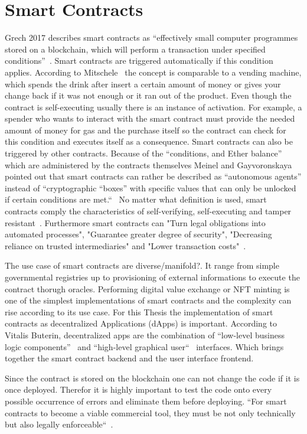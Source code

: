 \section{Smart Contracts}
Grech 2017 describes smart contracts as “effectively small computer programmes stored on a blockchain, which will perform a transaction under specified conditions”~\cite{GrechAlexander2017}. Smart contracts are triggered automatically if this condition applies. According to Mitschele~\cite{Mitschele2019} the concept is comparable to a vending machine, which spends the drink after insert a certain amount of money or gives your change back if it was not enough or it ran out of the product. Even though the contract is self-executing usually there is an instance of activation. For example, a spender who wants to interact with the smart contract must provide the needed amount of money for gas and the purchase itself so the contract can check for this condition and executes itself as a consequence. Smart contracts can also be triggered by other contracts.
Because of the “conditions, and Ether balance” which are administered by the contracts themselves Meinel and Gayvoronskaya pointed out that smart contracts can rather be described as “autonomous agents” instead of “cryptographic “boxes” with specific values that can only be unlocked if certain conditions are met.“~\cite{meinel2018blockchain}
No matter what definition is used, smart contracts comply the characteristics of self-verifying, self-executing and tamper resistant~\cite{Shermin2017}. Furthermore smart contracts can "Turn legal obligations into automated processes", "Guarantee greater degree of security", "Decreasing reliance on trusted intermediaries" and "Lower transaction costs"~\cite{Shermin2017}.

The use case of smart contracts are diverse/manifold?. It range from simple governmental registries up to provisioning of external informations to execute the contract thorugh oracles. Performing digital value exchange or NFT minting is one of the simplest implementations of smart contracts and the complexity can rise according to its use case.
For this Thesis the implementation of smart contracts as decentralized Applications (dApps) is important. According to Vitalis Buterin, decentralized apps are the combination of “low-level business logic components”~\cite{buterin2014next} and “high-level graphical user“~\cite{buterin2014next} interfaces. Which brings together the smart contract backend and the user interface frontend.


Since the contract is stored on the blockchain one can not change the code if it is once deployed. Therefor it is highly important to test the code onto every possible occurrence of errors and eliminate them before deploying. 
“For smart contracts to become a viable commercial tool, they must be not only technically but also legally enforceable“~\cite{mik2017smart}.


